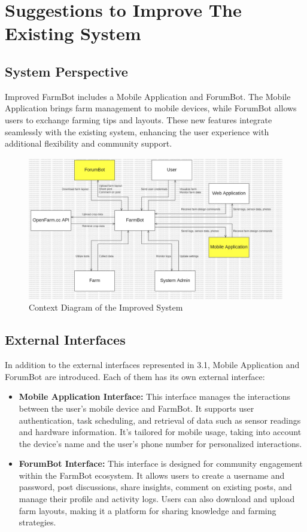 \chapter{Suggestions to Improve The Existing System} \label{suggestions}

\section{System Perspective}
Improved FarmBot includes a Mobile Application and ForumBot. The Mobile Application brings farm management to mobile devices, while ForumBot allows users to exchange farming tips and layouts. These new features integrate seamlessly with the existing system, enhancing the user experience with additional flexibility and community support.

\begin{figure}[htbp]
    \centering
    \includegraphics[width=1\linewidth]{Figures/context_diagram_improved.jpg}
    \caption{Context Diagram of the Improved System}
    \label{ContextDiagramImproved}
\end{figure}

\newpage

\section{External Interfaces}
In addition to the external interfaces represented in 3.1, Mobile Application and ForumBot are introduced. Each of them has its own external interface:
\begin{itemize}
    \item \textbf{Mobile Application Interface:} This interface manages the interactions between the user's mobile device and FarmBot. It supports user authentication, task scheduling, and retrieval of data such as sensor readings and hardware information. It's tailored for mobile usage, taking into account the device's name and the user's phone number for personalized interactions.
    \item \textbf{ForumBot Interface:} This interface is designed for community engagement within the FarmBot ecosystem. It allows users to create a username and password, post discussions, share insights, comment on existing posts, and manage their profile and activity logs. Users can also download and upload farm layouts, making it a platform for sharing knowledge and farming strategies.
\end{itemize}

